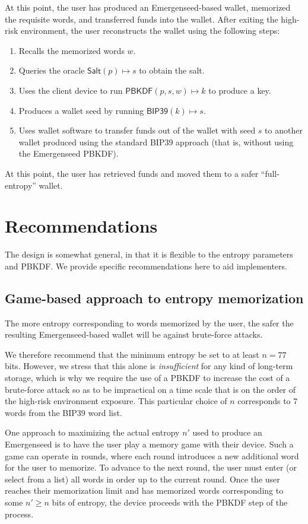 \documentclass{article}
\begin{document}
At this point, the user has produced an Emergenseed-based wallet, memorized the requisite words, and transferred funds into the wallet.
After exiting the high-risk environment, the user reconstructs the wallet using the following steps:
\begin{enumerate}
	\item Recalls the memorized words $w$.
	\item Queries the oracle $\mathsf{Salt}(p) \mapsto s$ to obtain the salt.
	\item Uses the client device to run $\mathsf{PBKDF}(p, s, w) \mapsto k$ to produce a key.
	\item Produces a wallet seed by running $\mathsf{BIP39}(k) \mapsto s$.
	\item Uses wallet software to transfer funds out of the wallet with seed $s$ to another wallet produced using the standard BIP39 approach (that is, without using the Emergenseed PBKDF).
\end{enumerate}

At this point, the user has retrieved funds and moved them to a safer ``full-entropy'' wallet.


\section{Recommendations}

The design is somewhat general, in that it is flexible to the entropy parameters and PBKDF.
We provide specific recommendations here to aid implementers.


\subsection{Game-based approach to entropy memorization}

The more entropy corresponding to words memorized by the user, the safer the resulting Emergenseed-based wallet will be against brute-force attacks.

We therefore recommend that the minimum entropy be set to at least $n = 77$ bits.
However, we stress that this alone is \textit{insufficient} for any kind of long-term storage, which is why we require the use of a PBKDF to increase the cost of a brute-force attack so as to be impractical on a time scale that is on the order of the high-risk environment exposure.
This particular choice of $n$ corresponds to $7$ words from the BIP39 word list.

One approach to maximizing the actual entropy $n'$ used to produce an Emergenseed is to have the user play a memory game with their device.
Such a game can operate in rounds, where each round introduces a new additional word for the user to memorize.
To advance to the next round, the user must enter (or select from a list) all words in order up to the current round.
Once the user reaches their memorization limit and has memorized words corresponding to some $n' \geq n$ bits of entropy, the device proceeds with the PBKDF step of the process.
\end{document}
